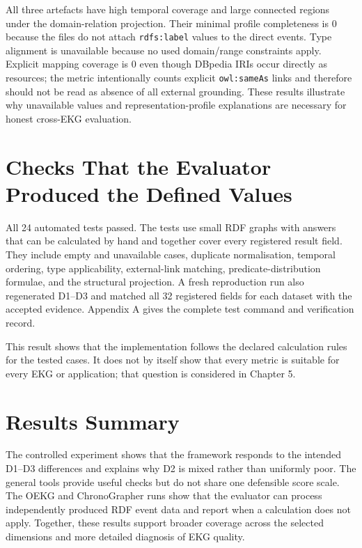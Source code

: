 All three artefacts have high temporal coverage and large connected regions under the domain-relation projection. Their minimal profile completeness is 0 because the files do not attach \texttt{rdfs:label} values to the direct events. Type alignment is unavailable because no used domain/range constraints apply. Explicit mapping coverage is 0 even though DBpedia IRIs occur directly as resources; the metric intentionally counts explicit \texttt{owl:sameAs} links and therefore should not be read as absence of all external grounding. These results illustrate why unavailable values and representation-profile explanations are necessary for honest cross-EKG evaluation.

\section{Checks That the Evaluator Produced the Defined Values}

All 24 automated tests passed. The tests use small RDF graphs with answers that can be calculated by hand and together cover every registered result field. They include empty and unavailable cases, duplicate normalisation, temporal ordering, type applicability, external-link matching, predicate-distribution formulae, and the structural projection. A fresh reproduction run also regenerated D1--D3 and matched all 32 registered fields for each dataset with the accepted evidence. Appendix A gives the complete test command and verification record.

This result shows that the implementation follows the declared calculation rules for the tested cases. It does not by itself show that every metric is suitable for every EKG or application; that question is considered in Chapter 5.

\section{Results Summary}

The controlled experiment shows that the framework responds to the intended D1--D3 differences and explains why D2 is mixed rather than uniformly poor. The general tools provide useful checks but do not share one defensible score scale. The OEKG and ChronoGrapher runs show that the evaluator can process independently produced RDF event data and report when a calculation does not apply. Together, these results support broader coverage across the selected dimensions and more detailed diagnosis of EKG quality.

